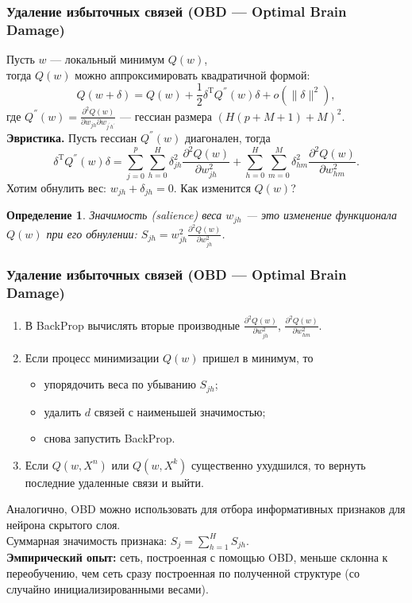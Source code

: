\documentclass[unicode, notheorems]{beamer}
\newtheorem{definition}{Определение}[theorem]
\begin{document}
\begin{frame}
	\frametitle{Удаление избыточных связей (OBD --- Optimal Brain Damage)}
	Пусть $w$ --- локальный минимум $Q(w)$,\\ тогда $Q(w)$ можно аппроксимировать квадратичной формой:
	\begin{equation*}
	Q(w + \delta) = Q(w) + \frac{1}{2} \delta^{\mathrm{T}} Q^{''}(w) \delta + o(\| \delta\|^2),
	\end{equation*}
	\small{где $Q^{''}(w) =  \frac{\partial^2 Q(w) }{\partial w_{jh} \partial w_{j^{'}h^{'}}}$ --- гессиан размера $(H(p+M+1) + M)^2$.}\\

	\textbf{Эвристика.} Пусть гессиан $Q^{''}(w)$ диагонален, тогда
	\begin{equation*}
	\delta^{\mathrm{T}} Q^{''}(w) \delta = \sum_{j=0}^{p}\sum_{h=0}^{H} \delta^2_{jh}   \frac{\partial^2 Q(w) }{\partial w_{jh}^2 }  +  \sum_{h=0}^{H}\sum_{m=0}^{M} \delta^2_{hm}   \frac{\partial^2 Q(w) }{\partial w_{hm}^2 }.
	\end{equation*}
	Хотим обнулить вес: $w_{jh} + \delta_{jh}=0$. Как изменится $Q(w)$?\\

	\begin{definition}
	\textit{Значимость (salience)} веса $w_{jh}$ --- это изменение функционала $Q(w)$ при его обнулении: $S_{jh} = w^2_{jh}  \frac{\partial^2 Q(w) }{\partial w_{jh}^2 } $.
	\end{definition} 
\end{frame} 

\begin{frame}
	\frametitle{Удаление избыточных связей (OBD --- Optimal Brain Damage)}
	\begin{enumerate}
		\item В BackProp вычислять вторые производные $\frac{\partial^2 Q(w) }{\partial w_{jh}^2 } $,  $\frac{\partial^2 Q(w) }{\partial w_{hm}^2 } $.
		\item Если процесс минимизации $Q(w)$ пришел в минимум, то
		\begin{itemize}
			\item упорядочить веса по убыванию $S_{jh}$;
			\item удалить $d$ связей с наименьшей значимостью;
			\item снова запустить BackProp.
		\end{itemize}
		\item Если $Q(w, X^n)$ или $Q(w, X^k)$ существенно ухудшился, то вернуть последние удаленные связи и выйти.
	\end{enumerate}
	\vspace{0.4cm}
	Аналогично, OBD можно использовать для 
	отбора информативных признаков для нейрона скрытого слоя.\\
	Суммарная значимость признака: $S_j = \sum_{h=1}^{H} S_{jh}$.\\
	\vspace{0.4cm}
	\textbf{Эмпирический опыт:} сеть, построенная с помощью OBD, 
 меньше склонна к переобучению, чем сеть сразу построенная по полученной структуре (со случайно инициализированными весами).
\end{frame} 


% 
\end{document}
